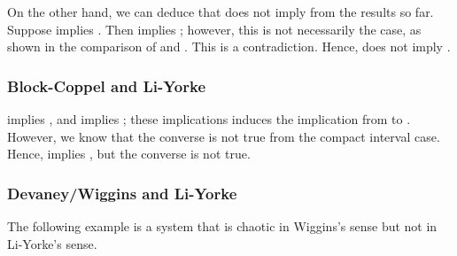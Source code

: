 \documentclass[10pt,twoside,draft]{book}
\begin{document}
On the other hand, we can deduce that \dev does not imply \blcp from the results so far.
Suppose \dev implies \blcp.
Then \dev implies \pte; however, this is not necessarily the case, as shown in the comparison of \dev and \pte.
This is a contradiction. 
Hence, \dev does not imply \blcp.

\subsubsection*{Block-Coppel and Li-Yorke}
\blcp implies \pte, and \pte implies \liy; these implications induces the implication from \blcp to \liy.
However, we know that the converse is not true from the compact interval case.
Hence, \blcp implies \liy, but the converse is not true.

\subsubsection*{Devaney/Wiggins and Li-Yorke}
The following example is a system that is chaotic in Wiggins's sense but not in Li-Yorke's sense.
\end{document}
